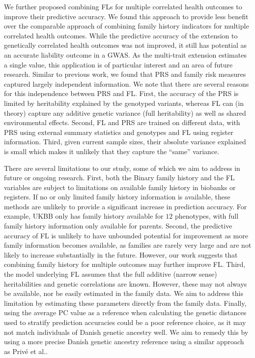 We further proposed combining FLs for multiple correlated health outcomes to improve their predictive accuracy. We found this approach to provide less benefit over the comparable approach of combining family history indicators for multiple correlated health outcomes. While the predictive accuracy of the extension to genetically correlated health outcomes was not improved, it still has potential as an accurate liability outcome in a GWAS. As the multi-trait extension estimates a single value, this application is of particular interest and an area of future research.
Similar to previous work\cite{mars2022systematic,wolford2021utility,hujoel2022incorporating}, we found that PRS and family risk measures captured largely independent information. We note that there are several reasons for this independence between PRS and FL. First, the accuracy of the PRS is limited by heritability explained by the genotyped variants, whereas FL can (in theory) capture any additive genetic variance (full heritability) as well as shared environmental effects. Second, FL and PRS are trained on different data, with PRS using external summary statistics and genotypes and FL using register information. Third, given current sample sizes, their absolute variance explained is small which makes it unlikely that they capture the \enquote{same} variance. 

There are several limitations to our study, some of which we aim to address in future or ongoing research. First, both the Binary family history and the FL variables are subject to limitations on available family history in biobanks or registers. If no or only limited family history information is available, these methods are unlikely to provide a significant increase in prediction accuracy. For example, UKBB only has family history available for $ 12 $ phenotypes, with full family history information only available for parents. Second, the predictive accuracy of FL is unlikely to have unbounded potential for improvement as more family information becomes available, as families are rarely very large and are not likely to increase substantially in the future. However, our work suggests that combining family history for multiple outcomes may further improve FL. Third, the model underlying FL assumes that the full additive (narrow sense) heritabilities and genetic correlations are known. However, these may not always be available, nor be easily estimated in the family data. We aim to address this limitation by estimating these parameters directly from the family data. Finally, using the average PC value as a reference when calculating the genetic distances used to stratify prediction accuracies could be a poor reference choice, as it may not match individuals of Danish genetic ancestry well. We aim to remedy this by using a more precise Danish genetic ancestry reference using a similar approach as Privé et al.\cite{prive2022portability}.


